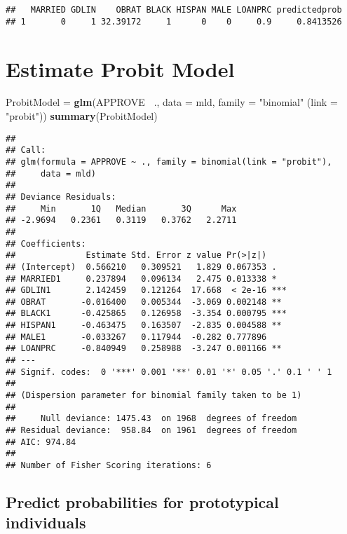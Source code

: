 \documentclass[]{article}
\newenvironment{Shaded}{\begin{snugshade}}{\end{snugshade}}
\newcommand{\DataTypeTok}[1]{\textcolor[rgb]{0.13,0.29,0.53}{#1}}
\newcommand{\KeywordTok}[1]{\textcolor[rgb]{0.13,0.29,0.53}{\textbf{#1}}}
\newcommand{\NormalTok}[1]{#1}
\newcommand{\OperatorTok}[1]{\textcolor[rgb]{0.81,0.36,0.00}{\textbf{#1}}}
\newcommand{\StringTok}[1]{\textcolor[rgb]{0.31,0.60,0.02}{#1}}
\begin{document}
\begin{verbatim}
##   MARRIED GDLIN    OBRAT BLACK HISPAN MALE LOANPRC predictedprob
## 1       0     1 32.39172     1      0    0     0.9     0.8413526
\end{verbatim}

\hypertarget{estimate-probit-model}{%
\section{Estimate Probit Model}\label{estimate-probit-model}}

\begin{Shaded}
\begin{Highlighting}[]
\NormalTok{ProbitModel =}\StringTok{ }\KeywordTok{glm}\NormalTok{(APPROVE }\OperatorTok{~}\NormalTok{., }\DataTypeTok{data =}\NormalTok{ mld, }
                  \DataTypeTok{family =} \StringTok{"binomial"}\NormalTok{ (}\DataTypeTok{link =} \StringTok{"probit"}\NormalTok{))}
\KeywordTok{summary}\NormalTok{(ProbitModel)}
\end{Highlighting}
\end{Shaded}

\begin{verbatim}
## 
## Call:
## glm(formula = APPROVE ~ ., family = binomial(link = "probit"), 
##     data = mld)
## 
## Deviance Residuals: 
##     Min       1Q   Median       3Q      Max  
## -2.9694   0.2361   0.3119   0.3762   2.2711  
## 
## Coefficients:
##              Estimate Std. Error z value Pr(>|z|)    
## (Intercept)  0.566210   0.309521   1.829 0.067353 .  
## MARRIED1     0.237894   0.096134   2.475 0.013338 *  
## GDLIN1       2.142459   0.121264  17.668  < 2e-16 ***
## OBRAT       -0.016400   0.005344  -3.069 0.002148 ** 
## BLACK1      -0.425865   0.126958  -3.354 0.000795 ***
## HISPAN1     -0.463475   0.163507  -2.835 0.004588 ** 
## MALE1       -0.033267   0.117944  -0.282 0.777896    
## LOANPRC     -0.840949   0.258988  -3.247 0.001166 ** 
## ---
## Signif. codes:  0 '***' 0.001 '**' 0.01 '*' 0.05 '.' 0.1 ' ' 1
## 
## (Dispersion parameter for binomial family taken to be 1)
## 
##     Null deviance: 1475.43  on 1968  degrees of freedom
## Residual deviance:  958.84  on 1961  degrees of freedom
## AIC: 974.84
## 
## Number of Fisher Scoring iterations: 6
\end{verbatim}

\hypertarget{predict-probabilities-for-prototypical-individuals}{%
\subsection{Predict probabilities for prototypical
individuals}\label{predict-probabilities-for-prototypical-individuals}}
\end{document}
